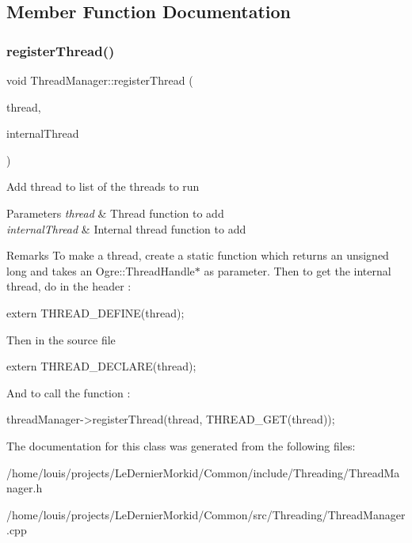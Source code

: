 \subsection{Member Function Documentation}
\mbox{\label{class_thread_manager_a7f63f89915ef17f37f741ae29c19682f}} 
\subsubsection{\texorpdfstring{register\+Thread()}{registerThread()}}
{\footnotesize\ttfamily void Thread\+Manager\+::register\+Thread (\begin{DoxyParamCaption}\item[{Thread\+Func}]{thread,  }\item[{Ogre\+::\+T\+H\+R\+E\+A\+D\+\_\+\+E\+N\+T\+R\+Y\+\_\+\+P\+O\+I\+NT}]{internal\+Thread }\end{DoxyParamCaption})\hspace{0.3cm}{\ttfamily [virtual]}}

Add thread to list of the threads to run 
\begin{DoxyParams}{Parameters}
{\em thread} & Thread function to add \\
\hline
{\em internal\+Thread} & Internal thread function to add \\
\hline
\end{DoxyParams}
\begin{DoxyRemark}{Remarks}
To make a thread, create a static function which returns an unsigned long and takes an Ogre\+::\+Thread\+Handle$\ast$ as parameter. Then to get the internal thread, do in the header \+: 
\begin{DoxyCode}
\textcolor{keyword}{extern} THREAD\_DEFINE(thread); 
\end{DoxyCode}
 Then in the source file 
\begin{DoxyCode}
\textcolor{keyword}{extern} THREAD\_DECLARE(thread); 
\end{DoxyCode}
 And to call the function \+: 
\begin{DoxyCode}
threadManager->registerThread(thread, THREAD\_GET(thread)); 
\end{DoxyCode}
 
\end{DoxyRemark}


The documentation for this class was generated from the following files\+:\begin{DoxyCompactItemize}
\item 
/home/louis/projects/\+Le\+Dernier\+Morkid/\+Common/include/\+Threading/Thread\+Manager.\+h\item 
/home/louis/projects/\+Le\+Dernier\+Morkid/\+Common/src/\+Threading/Thread\+Manager.\+cpp\end{DoxyCompactItemize}
